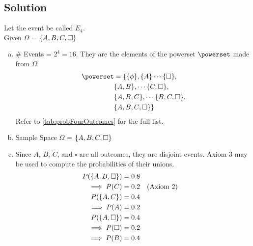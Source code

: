 \subsection{Solution}
Let the event be called $E_4$.\\
Given $\Omega$ = $\{A, B, C, \square\}$
\begin{enumerate}[a.]
	\item \# Events = $2^4 = 16$. They are the elements of the powerset $\powerset$ made from $\Omega$\\
	\begin{align*}
		\powerset &= \{ \set{\phi}, \set{A} \cdots \set{\square}, \nonumber\\
		&{} \set{A, B}, \cdots \set{C, \square}, \nonumber\\
		&{} \set{A, B, C}, \cdots \set{B, C, \square}, \nonumber \\
		&{} \set{A, B, C, \square}\} 
	\end{align*}
	Refer to \cref{tab:probFourOutcomes} for the full list.
	\item Sample Space $\Omega$ = $\{A, B, C, \square\}$
	\item Since $A$, $B$, $C$, and $\square$ are all outcomes, they are disjoint events. Axiom 3 may be used to compute the probabilities of their unions.
		\begin{align*}
			P(\{A, B, \square\}) &= 0.8 \nonumber\\
			\implies P(C) &= 0.2 && \text{(Axiom 2)} \nonumber\\
			P(\{A, C\}) &= 0.4 \nonumber\\
			\implies P(A) &= 0.2 \nonumber \\
			P(\{A, \square\}) &= 0.4 \nonumber \\
			\implies P(\square) &= 0.2 \nonumber \\
			\implies P(B) &= 0.4 \nonumber		 
		\end{align*}
		

\end{enumerate}
